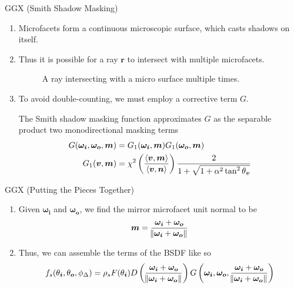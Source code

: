 \documentclass[10pt]{beamer}
\DeclarePairedDelimiter\ip{\langle }{\rangle}
\begin{document}
\begin{frame}{GGX (Smith Shadow Masking)}
  \begin{enumerate}
  \item Microfacets form a continuous microscopic surface, which casts shadows on itself.
  \item Thus it is possible for a ray \( \bm r\) to intersect with multiple microfacets.
    \begin{figure}[H]
      \caption{A ray intersecting with a micro surface multiple times.}
    \end{figure}
    
  \item To avoid double-counting, we must employ a corrective term \(G\).

    The Smith shadow masking function approximates \(G\) as the separable product two monodirectional masking terms
    \begin{align*}
      G(\bm{\omega_i}, \bm{\omega_o}, \bm m) &= G_1(\bm{\omega_i}, \bm m)G_1(\bm{\omega_o}, \bm m)\\
      G_1(\bm v, \bm m) &= \chi^2\del{\frac{\ip{\bm v, \bm m}}{\ip{\bm v, \bm n}}} \frac{2}{1 + \sqrt{1 + \alpha^2 \tan^2{\theta_{\bm v}}}}
    \end{align*}
  \end{enumerate}
\end{frame}

\begin{frame}{GGX (Putting the Pieces Together)}
  \begin{enumerate}
  \item Given \(\bm{\omega_{i}}\) and \(\bm{\omega_{o}}\), we find the mirror microfacet unit normal to be
    \[\bm m = \frac{\bm{\omega_i} + \bm{\omega_o}}{\norm{\bm{\omega_i} + \bm{\omega_o}}}\]
  \item Thus, we can assemble the terms of the BSDF like so
    \[f_s(\theta_{\bm i}, \theta_{\bm o}, \phi_\Delta) = \rho_sF(\theta_{\bm i})D\del{\frac{\bm{\omega_i} + \bm{\omega_o}}{\norm{\bm{\omega_i} + \bm{\omega_o}}}}G\del{\bm{\omega_i}, \bm{\omega_o}, \frac{\bm{\omega_i} + \bm{\omega_o}}{\norm{\bm{\omega_i} + \bm{\omega_o}}}}\]
  \end{enumerate}
\end{frame}
\end{document}
